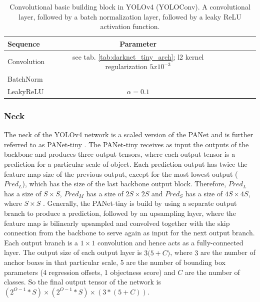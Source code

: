 \begin{table} %
\begin{center}

\begin{tabular}{l|c|c|c|c|c}
    \textbf{Sequence} & \textbf{Parameter}\\
    \hline
    Convolution & see tab. \ref{tab:darknet_tiny_arch}; l2 kernel regularization $5x10^{-3}$\\
    BatchNorm &\\
    LeakyReLU & $\alpha = 0.1$\\

\end{tabular}
\caption{Convolutional basic building block in YOLOv4 (YOLOConv). A convolutional layer, followed by a batch normalization layer, followed by a leaky ReLU activation function.}
\label{tab:yoloconv}

\end{center}
\end{table}

\subsubsection{Neck}

The neck of the \ac{YOLOv4} network is a scaled version of the \ac{PANet} \cite{pannet} and is further referred to as PANet-tiny \cite{yolov4_tiny}.
The PANet-tiny receives as input the outputs of the backbone and produces three output tensors, where each output tensor is a prediction for a particular scale of object.
Each prediction output has twice the feature map size of the previous output, except for the most lowest output ($Pred_L$), which has the size of the last backbone output block.
Therefore, $Pred_L$ has a size of $S \times S$, $Pred_M$ has a size of $2S \times 2S$ and $Pred_S$ has a size of $4S \times 4S$, where $S \times S$ .
Generally, the PANet-tiny is build by using a separate output branch to produce a prediction, followed by an upsampling layer, where the feature map is bilinearly upsampled and convolved together with the skip connection from the backbone to serve again as input for the next output branch.
Each output branch is a $1 \times 1$ convolution and hence acts as a fully-connected layer.
The output size of each output layer is $3 \dot (5+C)$, where $3$ are the number of anchor boxes in that particular scale, $5$ are the number of bounding box parameters (4 regression offsets, 1 objectness score) and $C$ are the number of classes.
So the final output tensor of the network is $(2^{O-1}*S) \times (2^{O-1}*S) \times (3*(5+C))$.


